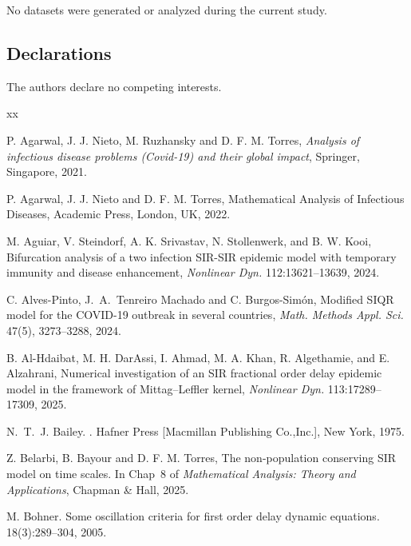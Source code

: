 \documentclass[pdflatex,sn-mathphys-num]{sn-jnl}
\theoremstyle{remark}
\begin{document}

No datasets were generated or analyzed during the current study.

\subsection*{Declarations}


The authors declare no competing interests.


\begin{thebibliography}{xx}
	
P. Agarwal, J. J. Nieto, M. Ruzhansky and D. F. M. Torres,
{\it Analysis of infectious disease problems (Covid-19) and their global impact}, 
Springer, Singapore, 2021. 

P. Agarwal, J. J. Nieto and D. F. M. Torres, 
Mathematical Analysis of Infectious Diseases, 
Academic Press, London, UK, 2022.

M. Aguiar, V. Steindorf, A. K. Srivastav, N. Stollenwerk, and B. W. Kooi,
Bifurcation analysis of a two infection SIR-SIR epidemic model 
with temporary immunity and disease enhancement, 
{\em Nonlinear Dyn.} 112:13621--13639, 2024. 

C. Alves-Pinto, J.~A.~Tenreiro Machado and C. Burgos-Sim\'on, 
Modified SIQR model for the COVID-19 outbreak in several countries, 
{\em Math. Methods Appl. Sci.} 47(5), 3273--3288, 2024.

B. Al-Hdaibat, M. H. DarAssi, I. Ahmad, M. A. Khan, R. Algethamie, and E. Alzahrani,
Numerical investigation of an SIR fractional order delay epidemic model 
in the framework of Mittag--Leffler kernel, 
{\em Nonlinear Dyn.} 113:17289--17309, 2025. 

N.~T.~J. Bailey.
.
\newblock Hafner Press [Macmillan Publishing Co.,Inc.], New York, 1975.

Z. Belarbi, B. Bayour and D. F. M. Torres,
The non-population conserving SIR model on time scales.
In Chap~8 of \emph{Mathematical Analysis: Theory and Applications}, 
Chapman \& Hall, 2025.

M. Bohner.
\newblock Some oscillation criteria for first order delay dynamic equations.
 18(3):289--304, 2005.


\end{thebibliography}
\end{document}
